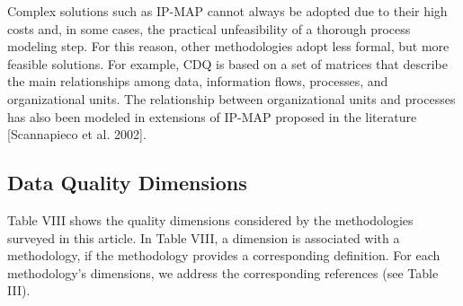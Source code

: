 \documentclass[pdftex,english,oribibl]{llncs}
\begin{document}
Complex solutions such as IP-MAP cannot always be adopted due to their high costs and, in some cases, the practical unfeasibility of a thorough process modeling step.
For this reason, other methodologies adopt less formal, but more feasible solutions.
For example, CDQ is based on a set of matrices that describe the main relationships among data, information flows, processes, and organizational units.
The relationship between organizational units and processes has also been modeled in extensions of IP-MAP proposed in the literature [Scannapieco et al. 2002].

\subsection{Data Quality Dimensions}
Table VIII shows the quality dimensions considered by the methodologies surveyed in this article.
In Table VIII, a dimension is associated with a methodology, if the methodology provides a corresponding definition.
For each methodology’s dimensions, we address the corresponding references (see Table III).
\end{document}
